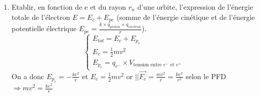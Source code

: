 \documentclass{article}
\begin{document}
\begin{enumerate}
\[    \]
    $\Longrightarrow \frac{1}{m}(mv)^{2} = \frac{ke^{2}}{r}$\newline
    $\Longleftrightarrow \frac{1}{m}\left(\frac{nh}{2\pi r}\right)^{2} = \frac{ke^{2}}{r}$\newline
    $\Longleftrightarrow \frac{1}{m}\frac{n^{2}h^{2}}{4\pi^{2}r_{n}^{2}} = \frac{ke^{2}}{r_{n}}$\newline
    $\Longleftrightarrow r_{n} = \left(\frac{h^{2}}{4\pi me^{2}}\right)n^{2}$ avec n$\in\mathbb{N^{*}}$\newline
    On obtient donc
    \[
        r_{n} = \left(\frac{h^{2}}{4\pi me^{2}}\right)n^{2}
        \quad
        \begin{varwidth}{\displaywidth}
            \begin{itemize}[nosep]
                \item $r_{n}$: rayon de l'orbite de la n-ième couche atomique
                \item h: constante de Planck (6,62$\times$10$^{-34}$J$\cdot$s)
                \item e: valeur absolue de la charge de l'électron (1,6$\times$10$^{-19}$C)
                \item m: masse de l'électron (9,1$\times$10$^{-31}$kg)
                \item k: constante de Coulomb (9$\times$10$^{-9}$SI)
            \end{itemize}
        \end{varwidth}
    \]
    On pose $a_{0}=r_{1}$ (plus petit rayon des orbites de l'électron, aussi appelé \textit{rayon de Bohr})\newline
    \underline{A.N:} $a_{0} = \frac{h^{2}}{4\pi me^{2}} \simeq 5,29\times 10^{11}m$
    \item Etablir, en fonction de e et du rayon $r_{n}$ d'une orbite, l'expression de l'énergie totale de l'électron $E = E_{c} + E_{pe}$ (somme de l'énergie cinétique et de l'énergie potentielle électrique $E_{pe} = \frac{k\times q_{proton}\times q_{electron}}{r}$).\newline
    \[\left\{ \begin{array}{l}
        E_{tot} = E_{c} + E_{p_{e}} \\
        E_{c} = \frac{1}{2}mv^{2} \\
        E_{p_{e}} = q_{e^{-}}\times V_{\text{tension entre $e^{-}$ et $e^{+}$}}
    \end{array}
    \]
    On a donc $E_{p_{e}} = -\frac{ke^{2}}{r}$ et\newline
    $E_{c} = \frac{1}{2}mv^{2}$ or $||\overrightarrow{F_{e}}=\frac{mv^{2}}{r}=\frac{ke^{2}}{r^{2}}$ selon le PFD $\Longrightarrow mv^{2}=\frac{ke^{2}}{r}$\newline

\end{enumerate}
\end{document}
